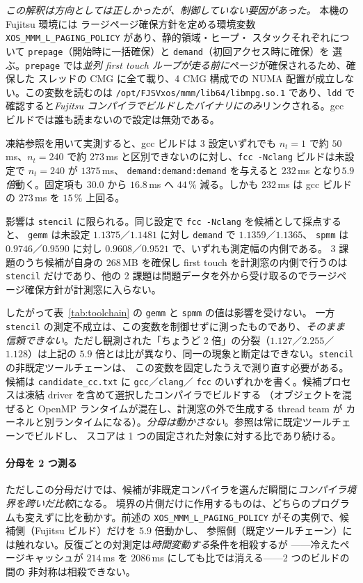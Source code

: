 \documentclass[conference,letterpaper]{IEEEtran}
\begin{document}
\emph{この解釈は方向としては正しかったが、制御していない要因があった。} 本機の Fujitsu 環境には
ラージページ確保方針を定める環境変数 \texttt{XOS\_MMM\_L\_PAGING\_POLICY} があり、静的領域・ヒープ・
スタックそれぞれについて \texttt{prepage}（開始時に一括確保）と \texttt{demand}（初回アクセス時に確保）を
選ぶ。\texttt{prepage} では\emph{並列 first touch ループが走る前に}ページが確保されるため、確保した
スレッドの CMG に全て載り、4 CMG 構成での NUMA 配置が成立しない。この変数を読むのは
\texttt{/opt/FJSVxos/mmm/lib64/libmpg.so.1} であり、\texttt{ldd} で確認すると\emph{Fujitsu
コンパイラでビルドしたバイナリにのみ}リンクされる。gcc ビルドでは誰も読まないので設定は無効である。

凍結参照を用いて実測すると、gcc ビルドは 3 設定いずれでも $n_t=1$ で約 $50$\,ms、$n_t=240$ で約
$273$\,ms と区別できないのに対し、\texttt{fcc -Nclang} ビルドは未設定で $n_t=240$ が $1375$\,ms、
\texttt{demand:demand:demand} を与えると $232$\,ms となり\emph{$5.9$ 倍}動く。固定項も $30.0$ から
$16.8$\,ms へ $44$\,\% 減る。しかも $232$\,ms は gcc ビルドの $273$\,ms を $15$\,\% 上回る。

影響は \texttt{stencil} に限られる。同じ設定で \texttt{fcc -Nclang} を候補として採点すると、
\texttt{gemm} は未設定 $1.1375$／$1.1481$ に対し \texttt{demand} で $1.1359$／$1.1365$、
\texttt{spmm} は $0.9746$／$0.9590$ に対し $0.9608$／$0.9521$ で、いずれも測定幅の内側である。
3 課題のうち候補が自身の $268$\,MB を確保し first touch を計測窓の内側で行うのは \texttt{stencil}
だけであり、他の 2 課題は問題データを外から受け取るのでラージページ確保方針が計測窓に入らない。

したがって表~\ref{tab:toolchain} の \texttt{gemm} と \texttt{spmm} の値は影響を受けない。
一方 \texttt{stencil} の測定不成立は、この変数を制御せずに測ったものであり、\emph{そのまま
信頼できない}。ただし観測された「ちょうど 2 倍」の分裂（$1.127$／$2.255$／$1.128$）は上記の
$5.9$ 倍とは比が異なり、同一の現象と断定はできない。\texttt{stencil} の非既定ツールチェーンは、
この変数を固定したうえで測り直す必要がある。候補は \texttt{candidate\_cc.txt} に \texttt{gcc}／\texttt{clang}／
\texttt{fcc} のいずれかを書く。候補プロセスは凍結 driver を含めて選択したコンパイラでビルドする
（オブジェクトを混ぜると OpenMP ランタイムが混在し、計測窓の外で生成する thread team が
カーネルと別ランタイムになる）。\emph{分母は動かさない}。参照は常に既定ツールチェーンでビルドし、
スコアは 1 つの固定された対象に対する比であり続ける。

\paragraph*{分母を 2 つ測る}
ただしこの分母だけでは、候補が非既定コンパイラを選んだ瞬間に\emph{コンパイラ境界を跨いだ比較}になる。
境界の片側だけに作用するものは、どちらのプログラムも変えずに比を動かす。前述の
\texttt{XOS\_MMM\_L\_PAGING\_POLICY} がその実例で、候補側（Fujitsu ビルド）だけを $5.9$ 倍動かし、
参照側（既定ツールチェーン）には触れない。反復ごとの対測定は\emph{時間変動する}条件を相殺するが
——冷えたページキャッシュが $214$\,ms を $2086$\,ms にしても比では消える——2 つのビルドの間の
非対称は相殺できない。
\end{document}
